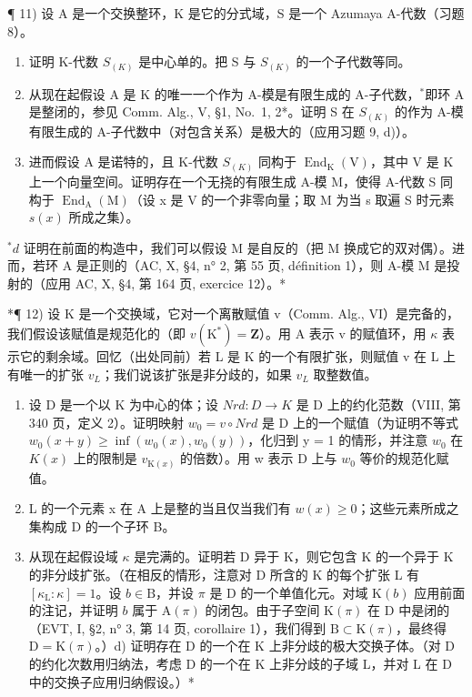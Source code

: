 ¶ 11) 设 A 是一个交换整环，K 是它的分式域，S 是一个 Azumaya A-代数（习题 8）。

\begin{enumerate}
\def\labelenumi{\alph{enumi})}
\item
  证明 K-代数 \(S_{(K)}\) 是中心单的。把 S 与 \(S_{(K)}\) 的一个子代数等同。
\item
  从现在起假设 A 是 K 的唯一一个作为 A-模是有限生成的 A-子代数，\(^{*}\)即环 A 是整闭的，参见 Comm. Alg., V, §1, No.~1, 2*。证明 S 在 \(S_{(K)}\) 的作为 A-模有限生成的 A-子代数中（对包含关系）是极大的（应用习题 9, d)）。
\item
  进而假设 A 是诺特的，且 K-代数 \(S_{(K)}\) 同构于 \(\operatorname{End}_{\mathrm{K}}(\mathrm{V})\)，其中 V 是 K 上一个向量空间。证明存在一个无挠的有限生成 A-模 M，使得 A-代数 S 同构于 \(\operatorname{End}_{\mathrm{A}}(\mathrm{M})\)（设 x 是 V 的一个非零向量；取 M 为当 s 取遍 S 时元素 \(s(x)\) 所成之集）。
\end{enumerate}

\(^{*}d\) 证明在前面的构造中，我们可以假设 M 是自反的（把 M 换成它的双对偶）。进而，若环 A 是正则的（AC, X, §4, n° 2, 第 55 页, définition 1），则 A-模 M 是投射的（应用 AC, X, §4, 第 164 页, exercice 12）。*

*¶ 12) 设 K 是一个交换域，它对一个离散赋值 v（Comm. Alg., VI）是完备的，我们假设该赋值是规范化的（即 \(v(\mathrm{K}^{*}) = \mathbf{Z}\)）。用 A 表示 v 的赋值环，用 \(\kappa\) 表示它的剩余域。回忆（出处同前）若 L 是 K 的一个有限扩张，则赋值 v 在 L 上有唯一的扩张 \(v_{L}\)；我们说该扩张是非分歧的，如果 \(v_{L}\) 取整数值。

\begin{enumerate}
\def\labelenumi{\alph{enumi})}
\item
  设 D 是一个以 K 为中心的体；设 \(Nrd : D \to K\) 是 D 上的约化范数（VIII, 第 340 页，定义 2）。证明映射 \(w_{0} = v \circ Nrd\) 是 D 上的一个赋值（为证明不等式 \(w_{0}(x + y) \geqslant \inf(w_{0}(x), w_{0}(y))\)，化归到 y = 1 的情形，并注意 \(w_{0}\) 在 \(K(x)\) 上的限制是 \(v_{\mathrm{K}(x)}\) 的倍数）。用 w 表示 D 上与 \(w_{0}\) 等价的规范化赋值。
\item
  L 的一个元素 x 在 A 上是整的当且仅当我们有 \(w(x) \geqslant 0\)；这些元素所成之集构成 D 的一个子环 B。
\item
  从现在起假设域 \(\kappa\) 是完满的。证明若 D 异于 K，则它包含 K 的一个异于 K 的非分歧扩张。（在相反的情形，注意对 D 所含的 K 的每个扩张 L 有 \([\kappa_{\mathrm{L}}:\kappa] = 1\)。设 \(b\in \mathrm{B}\)，并设 \(\pi\) 是 D 的一个单值化元。对域 \(\mathrm{K}(b)\) 应用前面的注记，并证明 \(b\) 属于 \(\mathrm{A}(\pi)\) 的闭包。由于子空间 \(\mathrm{K}(\pi)\) 在 D 中是闭的（EVT, I, §2, n° 3, 第 14 页, corollaire 1），我们得到 \(\mathrm{B}\subset \mathrm{K}(\pi)\)，最终得 \(\mathrm{D} = \mathrm{K}(\pi)\)。）d) 证明存在 D 的一个在 K 上非分歧的极大交换子体。（对 D 的约化次数用归纳法，考虑 D 的一个在 K 上非分歧的子域 L，并对 L 在 D 中的交换子应用归纳假设。）*
\end{enumerate}

